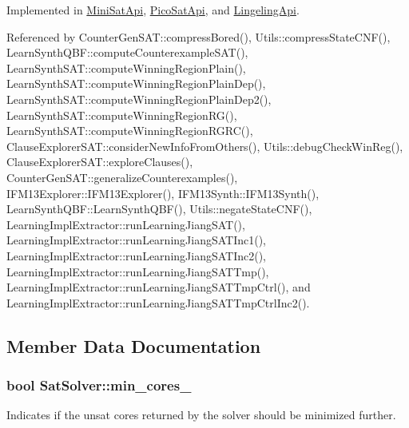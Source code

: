 Implemented in \hyperlink{classMiniSatApi_afe6f184e440ffe7f9b3a86045c15b450}{Mini\-Sat\-Api}, \hyperlink{classPicoSatApi_a5e32634944d14142ab0e2c4fdeb12d85}{Pico\-Sat\-Api}, and \hyperlink{classLingelingApi_a844da6cbdf38b7cc8abd0b1710350be2}{Lingeling\-Api}.



Referenced by Counter\-Gen\-S\-A\-T\-::compress\-Bored(), Utils\-::compress\-State\-C\-N\-F(), Learn\-Synth\-Q\-B\-F\-::compute\-Counterexample\-S\-A\-T(), Learn\-Synth\-S\-A\-T\-::compute\-Winning\-Region\-Plain(), Learn\-Synth\-S\-A\-T\-::compute\-Winning\-Region\-Plain\-Dep(), Learn\-Synth\-S\-A\-T\-::compute\-Winning\-Region\-Plain\-Dep2(), Learn\-Synth\-S\-A\-T\-::compute\-Winning\-Region\-R\-G(), Learn\-Synth\-S\-A\-T\-::compute\-Winning\-Region\-R\-G\-R\-C(), Clause\-Explorer\-S\-A\-T\-::consider\-New\-Info\-From\-Others(), Utils\-::debug\-Check\-Win\-Reg(), Clause\-Explorer\-S\-A\-T\-::explore\-Clauses(), Counter\-Gen\-S\-A\-T\-::generalize\-Counterexamples(), I\-F\-M13\-Explorer\-::\-I\-F\-M13\-Explorer(), I\-F\-M13\-Synth\-::\-I\-F\-M13\-Synth(), Learn\-Synth\-Q\-B\-F\-::\-Learn\-Synth\-Q\-B\-F(), Utils\-::negate\-State\-C\-N\-F(), Learning\-Impl\-Extractor\-::run\-Learning\-Jiang\-S\-A\-T(), Learning\-Impl\-Extractor\-::run\-Learning\-Jiang\-S\-A\-T\-Inc1(), Learning\-Impl\-Extractor\-::run\-Learning\-Jiang\-S\-A\-T\-Inc2(), Learning\-Impl\-Extractor\-::run\-Learning\-Jiang\-S\-A\-T\-Tmp(), Learning\-Impl\-Extractor\-::run\-Learning\-Jiang\-S\-A\-T\-Tmp\-Ctrl(), and Learning\-Impl\-Extractor\-::run\-Learning\-Jiang\-S\-A\-T\-Tmp\-Ctrl\-Inc2().



\subsection{Member Data Documentation}
\hypertarget{classSatSolver_adfeecebfd09606c82b5c57cfe5aad813}{
\subsubsection[{min\-\_\-cores\-\_\-}]{\setlength{\rightskip}{0pt plus 5cm}bool Sat\-Solver\-::min\-\_\-cores\-\_\-\hspace{0.3cm}{\ttfamily [protected]}}}\label{classSatSolver_adfeecebfd09606c82b5c57cfe5aad813}


Indicates if the unsat cores returned by the solver should be minimized further. 



